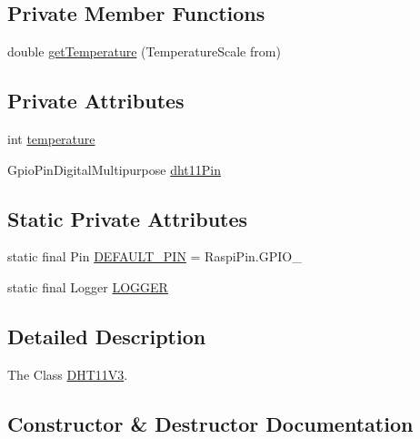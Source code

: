 \subsection*{Private Member Functions}
\begin{DoxyCompactItemize}
\item 
double \hyperlink{classcom_1_1libsensorj_1_1concretesensor_1_1DHT11V3_aba55ef9b04ccfa46d57079a526da9082}{get\+Temperature} (Temperature\+Scale from)
\end{DoxyCompactItemize}
\subsection*{Private Attributes}
\begin{DoxyCompactItemize}
\item 
int \hyperlink{classcom_1_1libsensorj_1_1concretesensor_1_1DHT11V3_a0c34b9cc559817c10910b1a6180decfd}{temperature}
\item 
Gpio\+Pin\+Digital\+Multipurpose \hyperlink{classcom_1_1libsensorj_1_1concretesensor_1_1DHT11V3_ab72b7b7ed1bd497e7b2818147afeeba9}{dht11\+Pin}
\end{DoxyCompactItemize}
\subsection*{Static Private Attributes}
\begin{DoxyCompactItemize}
\item 
static final Pin \hyperlink{classcom_1_1libsensorj_1_1concretesensor_1_1DHT11V3_a5abd2ea6b296cbd458df3e9170201913}{D\+E\+F\+A\+U\+L\+T\+\_\+\+P\+I\+N} = Raspi\+Pin.\+G\+P\+I\+O\+\_
\item 
static final Logger \hyperlink{classcom_1_1libsensorj_1_1concretesensor_1_1DHT11V3_ac0cd3bfc7916b033ac50cebead5ba268}{L\+O\+G\+G\+E\+R}
\end{DoxyCompactItemize}


\subsection{Detailed Description}
The Class \hyperlink{classcom_1_1libsensorj_1_1concretesensor_1_1DHT11V3}{D\+H\+T11\+V3}. 

\subsection{Constructor \& Destructor Documentation}
\hypertarget{classcom_1_1libsensorj_1_1concretesensor_1_1DHT11V3_a4996e16bdabeb71e35d8358a7e8248ca}{}
